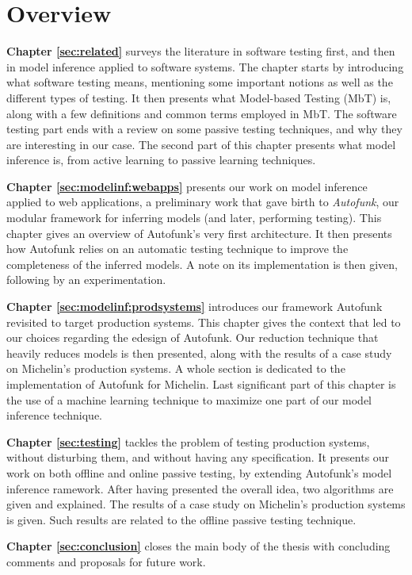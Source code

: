 \section{Overview}
\label{sec:intro:overview}

\textbf{Chapter \ref{sec:related}} surveys the literature in
software testing first, and then in model inference applied to
software systems. The chapter starts by introducing what software
testing means, mentioning some important notions as well as the
different types of testing. It then presents what Model-based
Testing (MbT) is, along with a few definitions and common terms
employed in MbT. The software testing part ends with a review on
some passive testing techniques, and why they are interesting in
our case. The second part of this chapter presents what model
inference is, from active learning to passive learning
techniques.

\textbf{Chapter \ref{sec:modelinf:webapps}} presents our work on
model inference applied to web applications, a preliminary work
that gave birth to \textit{Autofunk}, our modular framework for
inferring models (and later, performing testing). This chapter
gives an overview of Autofunk's very first architecture. It then
presents how Autofunk relies on an automatic testing technique to
improve the completeness of the inferred models. A note on its
implementation is then given, following by an experimentation.


\textbf{Chapter \ref{sec:modelinf:prodsystems}} introduces our
framework Autofunk revisited to target production systems. This
chapter gives the context that led to our choices regarding the
edesign of Autofunk. Our reduction technique that heavily reduces
models is then presented, along with the results of a case study
on Michelin's production systems. A whole section is dedicated to
the implementation of Autofunk for Michelin. Last significant
part of this chapter is the use of a machine learning technique
to maximize one part of our model inference technique.

\textbf{Chapter \ref{sec:testing}} tackles the problem of testing
production systems, without disturbing them, and without having
any specification. It presents our work on both offline and
online passive testing, by extending Autofunk's model inference
ramework. After having presented the overall idea, two algorithms
are given and explained. The results of a case study on
Michelin's production systems is given. Such results are related
to the offline passive testing technique.

\textbf{Chapter \ref{sec:conclusion}} closes the main body of the
thesis with concluding comments and proposals for future work.

\cleardoublepage
\blankpage
